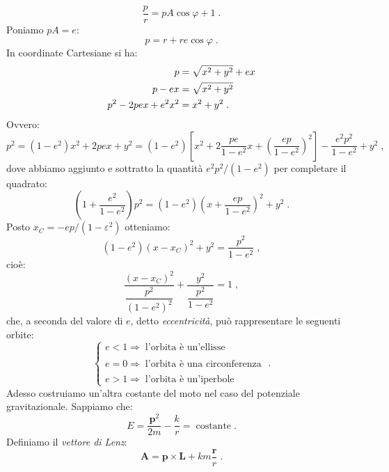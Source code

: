 \begin{equation}
\frac{p}{r}=pA\cos\varphi +1\;.
\end{equation}
Poniamo $pA=e$:
\begin{equation}
p=r+re\cos\varphi\;.
\end{equation}
In coordinate Cartesiane si ha:
\begin{align}
p &=\sqrt{x^2+y^2}+ex \notag \\
p-ex &= \sqrt{x^2+y^2} \notag \\
p^2-2pex+e^2x^2&=x^2+y^2\;.
\end{align}
Ovvero:
\begin{equation}
p^2=(1-e^2)x^2+2pex+y^2=(1-e^2)\left[x^2+2\frac{pe}{1-e^2}x+\left(\frac{ep}{1-e^2}\right)^2\right]-\frac{e^2p^2}{1-e^2}+y^2\;,
\end{equation}
dove abbiamo aggiunto e sottratto la quantità $e^2 p^2/(1-e^2)$ per completare il quadrato:
\begin{equation}
\left(1+\frac{e^2}{1-e^2}\right)p^2=(1-e^2)\left(x+\frac{ep}{1-e^2}\right)^2+y^2\;.
\end{equation}
Posto $x_C=-e p/(1-\varepsilon^2)$ otteniamo:
\begin{equation}
(1-e^2)(x-x_C)^2+y^2=\frac{p^2}{1-e^2}\;,
\end{equation}
cioè:
\begin{equation}
\frac{(x-x_C)^2}{\dfrac{p^2}{(1-e^2)^2}}+\frac{y^2}{\dfrac{p^2}{1-e^2}}=1\;,
\end{equation}
che, a seconda del valore di $e$, detto \textit{eccentricità}, può rappresentare le seguenti orbite:
\begin{equation}
\begin{cases}
e <1 \Longrightarrow \;\mbox{l'orbita è un'ellisse} \\
\\
e = 0 \Longrightarrow\;\mbox{l'orbita è una circonferenza} \\
\\
e >1 \Longrightarrow\;\mbox{l'orbita è un'iperbole}
\end{cases}\;.
\end{equation}
Adesso costruiamo un'altra costante del moto nel caso del potenziale gravitazionale. Sappiamo che:
\begin{equation}
E=\frac{\mathbf{p}^2}{2m}-\frac{k}{r}=\;\mbox{costante}\;.
\end{equation}
Definiamo il \textit{vettore di Lenz}:
\begin{equation}
\mathbf{A}=\mathbf{p}\times\mathbf{L}+km\frac{\mathbf{r}}{r}\;.
\end{equation}
